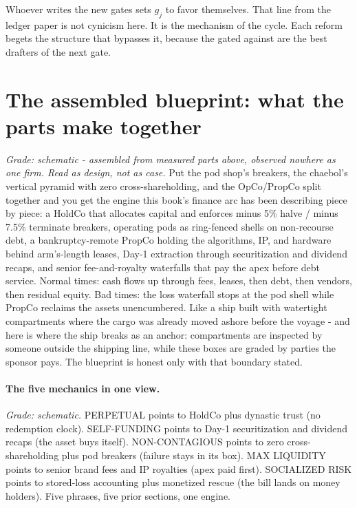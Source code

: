Whoever writes the new gates sets $g_j$ to favor themselves. That line from the ledger paper is not cynicism here. It is the mechanism of the cycle. Each reform begets the structure that bypasses it, because the gated against are the best drafters of the next gate.

\section{The assembled blueprint: what the parts make together}

\textit{Grade: schematic - assembled from measured parts above, observed nowhere as one firm. Read as design, not as case.} Put the pod shop's breakers, the chaebol's vertical pyramid with zero cross-shareholding, and the OpCo/PropCo split together and you get the engine this book's finance arc has been describing piece by piece: a HoldCo that allocates capital and enforces minus 5\% halve / minus 7.5\% terminate breakers, operating pods as ring-fenced shells on non-recourse debt, a bankruptcy-remote PropCo holding the algorithms, IP, and hardware behind arm's-length leases, Day-1 extraction through securitization and dividend recaps, and senior fee-and-royalty waterfalls that pay the apex before debt service. Normal times: cash flows up through fees, leases, then debt, then vendors, then residual equity. Bad times: the loss waterfall stops at the pod shell while PropCo reclaims the assets unencumbered. Like a ship built with watertight compartments where the cargo was already moved ashore before the voyage - and here is where the ship breaks as an anchor: compartments are inspected by someone outside the shipping line, while these boxes are graded by parties the sponsor pays. The blueprint is honest only with that boundary stated.

\paragraph{The five mechanics in one view.} \textit{Grade: schematic.} PERPETUAL points to HoldCo plus dynastic trust (no redemption clock). SELF-FUNDING points to Day-1 securitization and dividend recaps (the asset buys itself). NON-CONTAGIOUS points to zero cross-shareholding plus pod breakers (failure stays in its box). MAX LIQUIDITY points to senior brand fees and IP royalties (apex paid first). SOCIALIZED RISK points to stored-loss accounting plus monetized rescue (the bill lands on money holders). Five phrases, five prior sections, one engine.

